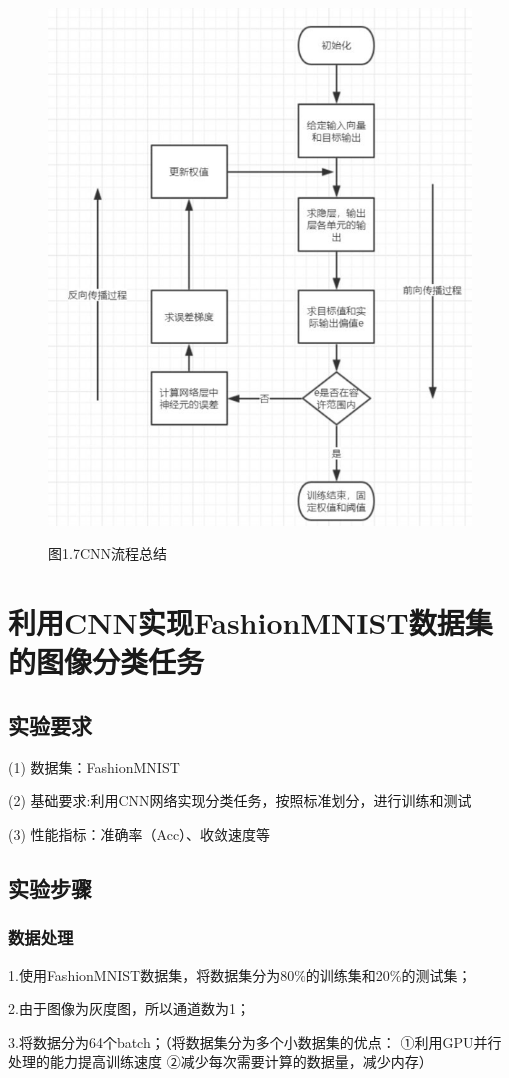 \documentclass[10.5pt,compsoc,UTF8]{CjC}
\theoremstyle{mystyle}
\begin{document}
\begin{figure}[htbp]
\centering
\centerline{\includegraphics[width=0.5\linewidth]{CNN7.png}}
\heiti 图1.7\quad  CNN流程总结
\label{fig1}
\end{figure}


\section{\heiti 利用CNN实现FashionMNIST数据集的图像分类任务}

\subsection{实验要求}
(1) 数据集：FashionMNIST

(2) 基础要求:利用CNN网络实现分类任务，按照标准划分，进行训练和测试

(3) 性能指标：准确率（Acc）、收敛速度等


\subsection{实验步骤}

\subsubsection{数据处理}

1.使用FashionMNIST数据集，将数据集分为80$\%$的训练集和20$\%$的测试集；

2.由于图像为灰度图，所以通道数为1；

3.将数据分为64个batch；（将数据集分为多个小数据集的优点：
①利用GPU并行处理的能力提高训练速度
②减少每次需要计算的数据量，减少内存）
\end{document}
